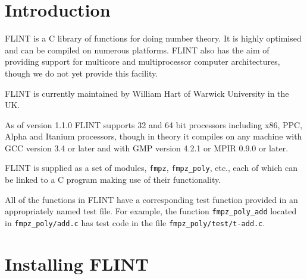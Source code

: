 \documentclass[a4paper,10pt]{book}
\newcommand{\code}{\lstinline}
\begin{document}

\frontmatter



\clearpage

\tableofcontents


\mainmatter

\chapter{Introduction}

FLINT is a C library of functions for doing number theory. It is highly 
optimised and can be compiled on numerous platforms.  FLINT also has the 
aim of providing support for multicore and multiprocessor computer 
architectures, though we do not yet provide this facility.

FLINT is currently maintained by William Hart of Warwick University in 
the UK.

As of version 1.1.0 FLINT supports 32 and 64 bit processors including 
x86, PPC, Alpha and Itanium processors, though in theory it compiles on any 
machine with GCC version 3.4 or later and with GMP version 4.2.1 or 
MPIR 0.9.0 or later.

FLINT is supplied as a set of modules, \code{fmpz}, \code{fmpz_poly}, etc., 
each of which can be linked to a C program making use of their functionality.

All of the functions in FLINT have a corresponding test function provided 
in an appropriately named test file.  For example, the function 
\code{fmpz_poly_add} located in \code{fmpz_poly/add.c} has test code in the 
file \code{fmpz_poly/test/t-add.c}.

\chapter{Installing FLINT}
\end{document}
